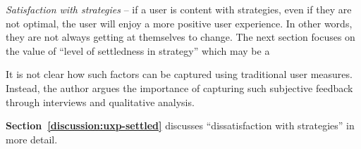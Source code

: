 \item \textit{Satisfaction with strategies} -- if a user is content with strategies, even if they are not optimal, the user will enjoy a more positive user experience.  In other words, they are not always getting at themselves to change.  The next section focuses on the value of ``level of settledness in strategy'' which may be a 

It is not clear how such factors can be captured using traditional user measures.  Instead, the author argues the importance of capturing such subjective feedback through interviews and qualitative analysis.

\textbf{Section~\ref{discussion:uxp-settled}} discusses ``dissatisfaction with strategies'' in more detail.  %
